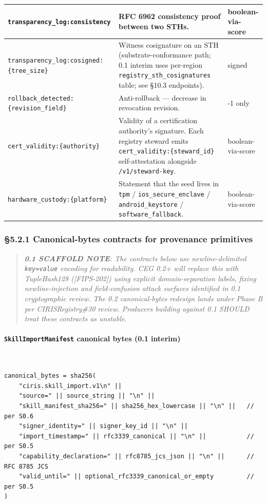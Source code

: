 \documentclass[11pt]{article}
\begin{document}
{\begin{longtable}{|p{5.33cm}|p{5.33cm}|p{5.33cm}|}
\texttt{transparency\_log:consistency} & RFC 6962 consistency proof between two STHs. & boolean-via-score \\ \hline
\texttt{transparency\_log:cosigned:\{tree\_size\}} & Witness cosignature on an STH (substrate-conformance path; 0.1 interim uses per-region \texttt{registry\_sth\_cosignatures} table; see §10.3 endpoints). & signed \\ \hline
\texttt{rollback\_detected:\{revision\_field\}} & Anti-rollback — decrease in revocation revision. & -1 only \\ \hline
\texttt{cert\_validity:\{authority\}} & Validity of a certification authority's signature. Each registry steward emits \texttt{cert\_validity:\{steward\_id\}} self-attestation alongside \texttt{/v1/steward-key}. & boolean-via-score \\ \hline
\texttt{hardware\_custody:\{platform\}} & Statement that the seed lives in \texttt{tpm} / \texttt{ios\_secure\_enclave} / \texttt{android\_keystore} / \texttt{software\_fallback}. & boolean-via-score \\ \hline
\end{longtable}}


\subsubsection*{§5.2.1 Canonical-bytes contracts for provenance primitives}


\begin{quote}\itshape \textbf{0.1 SCAFFOLD NOTE}: The contracts below use newline-delimited \texttt{key=value} encoding for readability. CEG 0.2+ will replace this with TupleHash128 ([FIPS-202]) using explicit domain-separation labels, fixing newline-injection and field-confusion attack surfaces identified in 0.1 cryptographic review. The 0.2 canonical-bytes redesign lands under Phase B per CIRISRegistry\#30 review. Producers building against 0.1 SHOULD treat these contracts as unstable.\end{quote}


\paragraph{\texttt{SkillImportManifest} canonical bytes (0.1 interim)}\mbox{}\\


\begin{lstlisting}
canonical_bytes = sha256(
    "ciris.skill_import.v1\n" ||
    "source=" || source_string || "\n" ||
    "skill_manifest_sha256=" || sha256_hex_lowercase || "\n" ||   // per S0.6
    "signer_identity=" || signer_key_id || "\n" ||
    "import_timestamp=" || rfc3339_canonical || "\n" ||           // per S0.5
    "capability_declaration=" || rfc8785_jcs_json || "\n" ||      // RFC 8785 JCS
    "valid_until=" || optional_rfc3339_canonical_or_empty         // per S0.5
)
\end{lstlisting}
\end{document}
